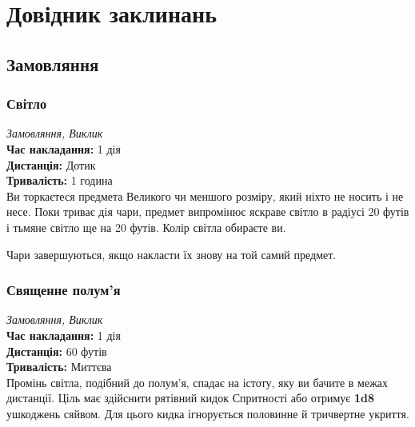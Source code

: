 \documentclass[letterpaper,openany,oneside,twocolumn]{book}
\newcommand{\spellsheetchoice}{\renderspellsheet}
\begin{document}
\onecolumn

\rendercharactersheet

\spellsheetchoice

\clearpage
\twocolumn
{}
\chapter*{Довідник заклинань}
\setlength{\parindent}{0pt}

\section*{Замовляння}

\subsection*{Світло}
\textit{Замовляння, Виклик}\\
\textbf{Час накладання:} 1 дія \\
\textbf{Дистанція:} Дотик \\
\textbf{Тривалість:} 1 година \\
Ви торкаєтеся предмета Великого чи меншого розміру, який ніхто не носить і не несе. Поки триває дія чари, предмет випромінює яскраве світло в радіусі 20 футів і тьмяне світло ще на 20 футів. Колір світла обираєте ви.

Чари завершуються, якщо накласти їх знову на той самий предмет.

\subsection*{Священне полум'я}
\textit{Замовляння, Виклик}\\
\textbf{Час накладання:} 1 дія \\
\textbf{Дистанція:} 60 футів \\
\textbf{Тривалість:} Миттєва \\
Промінь світла, подібний до полум’я, спадає на істоту, яку ви бачите в межах дистанції. Ціль має здійснити рятівний кидок Спритності або отримує \textbf{1d8} ушкоджень сяйвом. Для цього кидка ігнорується половинне й тричвертне укриття.
\end{document}
